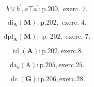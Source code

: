 \[
b \vee b ^ {\prime}, a \top a ^ {\prime}: \mathrm{p.} 2 0 0, \text {   exerc.   } 7.
\]

\[
\mathrm{di} _ {\mathbf {A}} (\mathbf {M}): \mathbf {p}. 2 0 2, \text {   exerc.   } 4.
\]

\[
\mathrm{dpl} _ {\mathbf {A}} (\mathbf {M}): \text { p. } 2 0 2, \text { exerc. } 7.
\]

\[
\operatorname{td} (\mathbf {A}): \mathrm{p.202,exerc.8.}
\]

\[
\mathrm{da} _ {k} (\mathrm{A}): \mathrm{p.205,exerc.25.}
\]

\[
\operatorname{dc} (\mathbf {G}): \mathrm{p.206,exerc.28.}
\]

